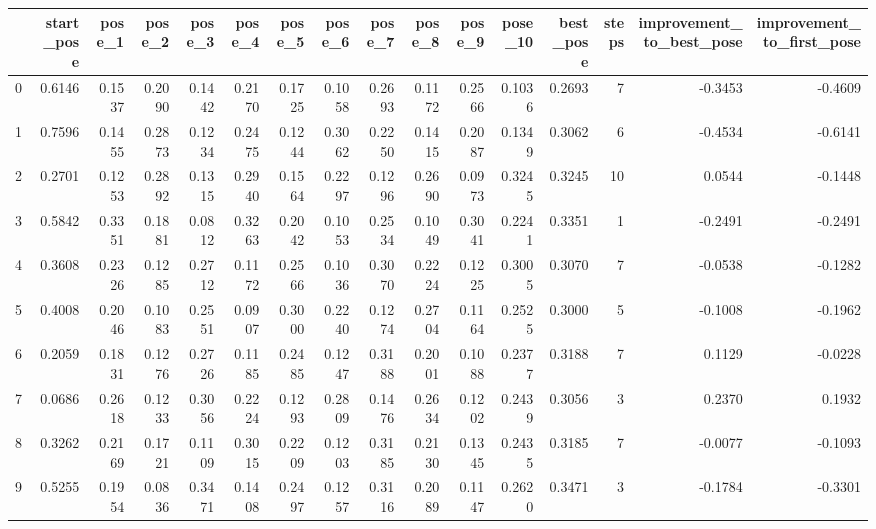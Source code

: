 \begin{tabular}{lrrrrrrrrrrrrrrr}
\toprule
{} &  start\_pose &  pose\_1 &  pose\_2 &  pose\_3 &  pose\_4 &  pose\_5 &  pose\_6 &  pose\_7 &  pose\_8 &  pose\_9 &  pose\_10 &  best\_pose &  steps &  improvement\_to\_best\_pose &  improvement\_to\_first\_pose \\
\midrule
0   &      0.6146 &  0.1537 &  0.2090 &  0.1442 &  0.2170 &  0.1725 &  0.1058 &  0.2693 &  0.1172 &  0.2566 &   0.1036 &     0.2693 &      7 &                   -0.3453 &                    -0.4609 \\
1   &      0.7596 &  0.1455 &  0.2873 &  0.1234 &  0.2475 &  0.1244 &  0.3062 &  0.2250 &  0.1415 &  0.2087 &   0.1349 &     0.3062 &      6 &                   -0.4534 &                    -0.6141 \\
2   &      0.2701 &  0.1253 &  0.2892 &  0.1315 &  0.2940 &  0.1564 &  0.2297 &  0.1296 &  0.2690 &  0.0973 &   0.3245 &     0.3245 &     10 &                    0.0544 &                    -0.1448 \\
3   &      0.5842 &  0.3351 &  0.1881 &  0.0812 &  0.3263 &  0.2042 &  0.1053 &  0.2534 &  0.1049 &  0.3041 &   0.2241 &     0.3351 &      1 &                   -0.2491 &                    -0.2491 \\
4   &      0.3608 &  0.2326 &  0.1285 &  0.2712 &  0.1172 &  0.2566 &  0.1036 &  0.3070 &  0.2224 &  0.1225 &   0.3005 &     0.3070 &      7 &                   -0.0538 &                    -0.1282 \\
5   &      0.4008 &  0.2046 &  0.1083 &  0.2551 &  0.0907 &  0.3000 &  0.2240 &  0.1274 &  0.2704 &  0.1164 &   0.2525 &     0.3000 &      5 &                   -0.1008 &                    -0.1962 \\
6   &      0.2059 &  0.1831 &  0.1276 &  0.2726 &  0.1185 &  0.2485 &  0.1247 &  0.3188 &  0.2001 &  0.1088 &   0.2377 &     0.3188 &      7 &                    0.1129 &                    -0.0228 \\
7   &      0.0686 &  0.2618 &  0.1233 &  0.3056 &  0.2224 &  0.1293 &  0.2809 &  0.1476 &  0.2634 &  0.1202 &   0.2439 &     0.3056 &      3 &                    0.2370 &                     0.1932 \\
8   &      0.3262 &  0.2169 &  0.1721 &  0.1109 &  0.3015 &  0.2209 &  0.1203 &  0.3185 &  0.2130 &  0.1345 &   0.2435 &     0.3185 &      7 &                   -0.0077 &                    -0.1093 \\
9   &      0.5255 &  0.1954 &  0.0836 &  0.3471 &  0.1408 &  0.2497 &  0.1257 &  0.3116 &  0.2089 &  0.1147 &   0.2620 &     0.3471 &      3 &                   -0.1784 &                    -0.3301 \\

\end{tabular}
